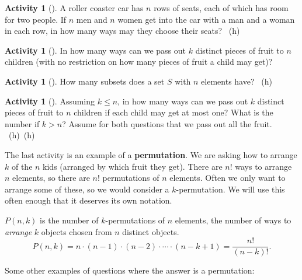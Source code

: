 \documentclass[10pt,]{book}
\newcommand{\terminology}[1]{\textbf{#1}}
\theoremstyle{plain}
\theoremstyle{definition}
\theoremstyle{definition}
\theoremstyle{definition}
\newtheorem{activity}[project]{Activity}
\numberwithin{equation}{chapter}
\begin{document}
\begin{activity}[]\label{activity-80}
\hypertarget{p-639}{}%
A roller coaster car has \(n\) rows of seats, each of which has room for two people. If \(n\) men and \(n\) women get into the car with a man and a woman in each row, in how many ways may they choose their seats?%
~{\tiny (h)}\end{activity}
\begin{activity}[]\label{activity-81}
\hypertarget{p-642}{}%
In how many ways can we pass out \(k\) distinct pieces of fruit to \(n\) children (with no restriction on how many pieces of fruit a child may get)?%
\end{activity}
\begin{activity}[]\label{SubsetsFirstTime}
\hypertarget{p-644}{}%
How many subsets does a set \(S\) with \(n\) elements have?%
~{\tiny (h)}\end{activity}
\begin{activity}[]\label{activity-83}
\hypertarget{p-647}{}%
Assuming \(k\le n\), in how many ways can we pass out \(k\) distinct pieces of fruit to \(n\) children if each child may get at most one? What is the number if \(k>n\)? Assume for both questions that we pass out all the fruit.%
~{\tiny (h)}~{\tiny (h)}\end{activity}
\hypertarget{p-651}{}%
The last activity is an example of a \terminology{permutation}.  We are asking how to arrange \(k\) of the \(n\) kids (arranged by which fruit they get).  There are \(n!\) ways to arrange \(n\) elements, so there are \(n!\) permutations of \(n\) elements.  Often we only want to arrange some of these, so we would consider a \(k\)-permutation.   We will use this often enough that it deserves its own notation.%
\begin{assemblage}\label{assemblage-permutation}
\hypertarget{p-652}{}%
\(P(n,k)\) is the number of \(k\)-permutations of \(n\) elements, the number of ways to \emph{arrange} \(k\) objects chosen from \(n\) distinct objects.%
\begin{equation*}
P(n,k) = n\cdot (n-1) \cdot (n-2) \cdot \cdots \cdot (n-k+1) = \frac{n!}{(n-k)!}.
\end{equation*}
%
\end{assemblage}
\hypertarget{p-653}{}%
Some other examples of questions where the answer is a permutation: \leavevmode%
\end{document}
